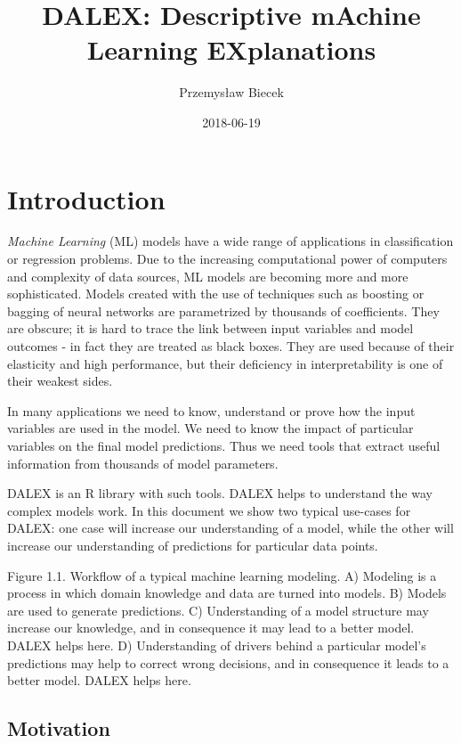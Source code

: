 \documentclass[]{book}
\title{DALEX: Descriptive mAchine Learning EXplanations}
\author{Przemysław Biecek}
\date{2018-06-19}
\theoremstyle{definition}
\theoremstyle{definition}
\theoremstyle{definition}
\theoremstyle{remark}
\begin{document}
\maketitle

{
\setcounter{tocdepth}{1}
\tableofcontents
}
\hypertarget{introduction}{%
\chapter{Introduction}\label{introduction}}

\emph{Machine Learning} (ML) models have a wide range of applications in
classification or regression problems. Due to the increasing
computational power of computers and complexity of data sources, ML
models are becoming more and more sophisticated. Models created with the
use of techniques such as boosting or bagging of neural networks are
parametrized by thousands of coefficients. They are obscure; it is hard
to trace the link between input variables and model outcomes - in fact
they are treated as black boxes. They are used because of their
elasticity and high performance, but their deficiency in
interpretability is one of their weakest sides.

In many applications we need to know, understand or prove how the input
variables are used in the model. We need to know the impact of
particular variables on the final model predictions. Thus we need tools
that extract useful information from thousands of model parameters.

DALEX \citep[see][]{DALEX} is an R \citep{RcoreT} library with such
tools. DALEX helps to understand the way complex models work. In this
document we show two typical use-cases for DALEX: one case will increase
our understanding of a model, while the other will increase our
understanding of predictions for particular data points.

{Figure 1.1. Workflow of a typical machine learning modeling. A)
Modeling is a process in which domain knowledge and data are turned into
models. B) Models are used to generate predictions. C) Understanding of
a model structure may increase our knowledge, and in consequence it may
lead to a better model. DALEX helps here. D) Understanding of drivers
behind a particular model's predictions may help to correct wrong
decisions, and in consequence it leads to a better model. DALEX helps
here. }

\hypertarget{motivation}{%
\section{Motivation}\label{motivation}}
\end{document}
